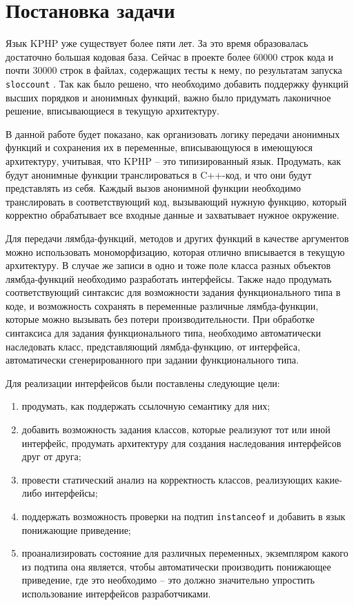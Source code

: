 
\startrelatedwork
\chapter{Постановка задачи}
Язык KPHP уже существует более пяти лет.
За это время образовалась достаточно большая кодовая база.
Сейчас в проекте более 60000 строк кода и почти 30000 строк в файлах, содержащих тесты к нему, по результатам запуска \verb|sloccount| \cite{sloccount}.
Так как было решено, что необходимо добавить поддержку функций высших порядков и анонимных функций, важно было придумать лаконичное решение, вписывающиеся в текущую архитектуру.

В данной работе будет показано, как организовать логику передачи анонимных функций и сохранения их в переменные, вписывающуюся в имеющуюся архитектуру, учитывая, что KPHP -- это типизированный язык.
Продумать, как будут анонимные функции транслироваться в C++-код, и что они будут представлять из себя.
Каждый вызов анонимной функции необходимо транслировать в соответствующий код, вызывающий нужную функцию, который корректно обрабатывает все входные данные и захватывает нужное окружение.

Для передачи лямбда-функций, методов и других функций в качестве аргументов можно использовать мономорфизацию, которая отлично вписывается в текущую архитектуру.
В случае же записи в одно и тоже поле класса разных объектов лямбда-функций необходимо разработать интерфейсы.
Также надо продумать соответствующий синтаксис для возможности задания функционального типа в коде, и возможность сохранять в переменные различные лямбда-функции, которые можно вызывать без потери производительности.
При обработке синтаксиса для задания функционального типа, необходимо автоматически наследовать класс, представляющий лямбда-функцию, от интерфейса, автоматически сгенерированного при задании функционального типа. 

Для реализации интерфейсов были поставлены следующие цели:
\begin{enumerate}
  \item продумать, как поддержать ссылочную семантику для них;
  \item добавить возможность задания классов, которые реализуют тот или иной интерфейс, продумать архитектуру для создания наследования интерфейсов друг от друга;
  \item провести статический анализ на корректность классов, реализующих какие-либо интерфейсы;
  \item поддержать возможность проверки на подтип \verb|instanceof| и добавить в язык понижающие приведение;
  \item проанализировать состояние для различных переменных, экземпляром какого из подтипа она является, чтобы автоматически производить понижающее приведение, где это необходимо -- это должно значительно упростить использование интерфейсов разработчиками.
\end{enumerate}

